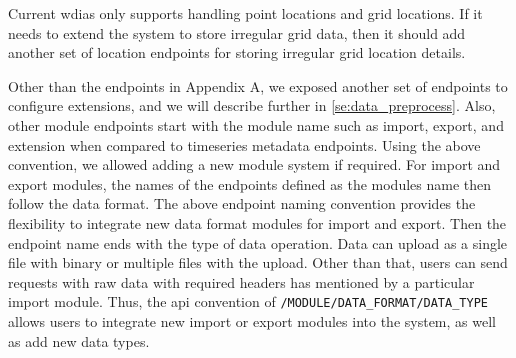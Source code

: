 Current \acrshort{wdias} only supports handling point locations and grid locations. If it needs to extend the system to store irregular grid data, then it should add another set of location endpoints for storing irregular grid location details.

Other than the endpoints in Appendix A, we exposed another set of endpoints to configure extensions, and we will describe further in \cref{se:data_preprocess}.
Also, other module endpoints start with the module name such as import, export, and extension when compared to timeseries metadata endpoints. Using the above convention, we allowed adding a new module system if required.
For import and export modules, the names of the endpoints defined as the modules name then follow the data format. The above endpoint naming convention provides the flexibility to integrate new data format modules for import and export. Then the endpoint name ends with the type of data operation. Data can upload as a single file with binary or multiple files with the upload. Other than that, users can send requests with raw data with required headers has mentioned by a particular import module.
Thus, the \acrshort{api} convention of \texttt{/MODULE/DATA\_FORMAT/DATA\_TYPE} allows users to integrate new import or export modules into the system, as well as add new data types.
